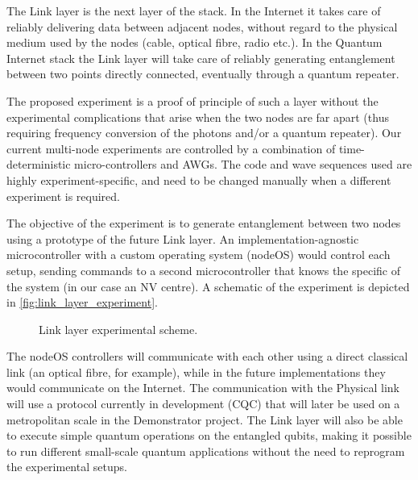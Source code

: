 \documentclass[a4paper, twoside]{article}
\begin{document}
The Link layer is the next layer of the stack. In the Internet it takes care of reliably delivering data between adjacent nodes, without regard to the physical medium used by the nodes (cable, optical fibre, radio etc.).  In the Quantum Internet stack the Link layer will take care of reliably generating entanglement between two points directly connected, eventually through a quantum repeater.

The proposed experiment is a proof of principle of such a layer without the experimental complications that arise when the two nodes are far apart (thus requiring frequency conversion of the photons and/or a quantum repeater).
Our current multi-node experiments are controlled by a combination of time-deterministic micro-controllers and \acp{AWG}. The code and wave sequences used are highly experiment-specific, and need to be changed manually when a different experiment is required.

The objective of the experiment is to generate entanglement between two nodes using a prototype of the future Link layer.
An implementation-agnostic microcontroller with a custom operating system (nodeOS) would control each setup, sending commands to a second microcontroller that knows the specific of the system (in our case an NV centre). A schematic of the experiment is depicted in \autoref{fig:link_layer_experiment}.

\begin{figure}
	\caption{Link layer experimental scheme.}
	\label{fig:link_layer_experiment}
\end{figure}

The nodeOS controllers will communicate with each other using a direct classical link (an optical fibre, for example), while in the future implementations they would communicate on the Internet. The communication with the Physical link will use a protocol currently in development (\ac{CQC}) that will later be used on a metropolitan scale in the Demonstrator project.
The Link layer will also be able to execute simple quantum operations on the entangled qubits, making it possible to run different small-scale quantum applications without the need to reprogram the experimental setups.

\end{document}
